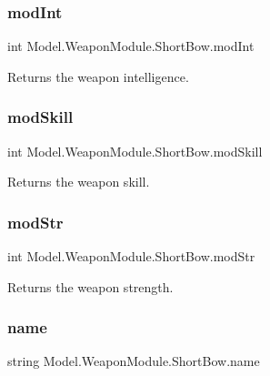 \subsubsection{\texorpdfstring{mod\+Int}{modInt}}
{\footnotesize\ttfamily int Model.\+Weapon\+Module.\+Short\+Bow.\+mod\+Int\hspace{0.3cm}{\ttfamily [get]}}

Returns the weapon intelligence. \hypertarget{class_model_1_1_weapon_module_1_1_short_bow_a7a263e41527b007e5d26e9a6e420d0b7}{}\label{class_model_1_1_weapon_module_1_1_short_bow_a7a263e41527b007e5d26e9a6e420d0b7} 
\subsubsection{\texorpdfstring{mod\+Skill}{modSkill}}
{\footnotesize\ttfamily int Model.\+Weapon\+Module.\+Short\+Bow.\+mod\+Skill\hspace{0.3cm}{\ttfamily [get]}}

Returns the weapon skill. \hypertarget{class_model_1_1_weapon_module_1_1_short_bow_a8b72cafa7bda999d4f89917fd3d53336}{}\label{class_model_1_1_weapon_module_1_1_short_bow_a8b72cafa7bda999d4f89917fd3d53336} 
\subsubsection{\texorpdfstring{mod\+Str}{modStr}}
{\footnotesize\ttfamily int Model.\+Weapon\+Module.\+Short\+Bow.\+mod\+Str\hspace{0.3cm}{\ttfamily [get]}}

Returns the weapon strength. \hypertarget{class_model_1_1_weapon_module_1_1_short_bow_a9b44d9d2d2df34bed52509ed217aee68}{}\label{class_model_1_1_weapon_module_1_1_short_bow_a9b44d9d2d2df34bed52509ed217aee68} 
\subsubsection{\texorpdfstring{name}{name}}
{\footnotesize\ttfamily string Model.\+Weapon\+Module.\+Short\+Bow.\+name\hspace{0.3cm}{\ttfamily [get]}}

